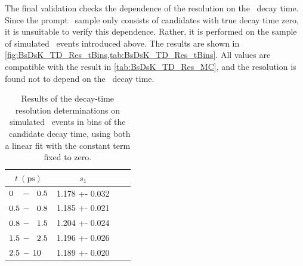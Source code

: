 The final validation checks the dependence of the resolution on the \Bs~decay time.
Since the prompt \Dspm~sample only consists of candidates with true decay time zero, it is unsuitable to verify this dependence.
Rather, it is performed on the sample of simulated \BsDsK~events introduced above.
The results are shown in \cref{fig:BsDsK_TD_Res_tBins,tab:BsDsK_TD_Res_tBins}.
All values are compatible with the result in \cref{tab:BsDsK_TD_Res_MC}, and the resolution is found not to depend on the \Bs~decay time.
%
\begin{table}[hb] \centerfloat
    \caption{
        Results of the decay-time resolution determinations on simulated \BsDsK~events in bins of the \Bs~candidate decay time, using both a linear fit with the constant term fixed to zero.}
    \label{tab:BsDsK_TD_Res_tBins}
    \begin{tabular}{cS[table-format=1.3(3)]S[table-format=2.1(1)]S[table-format=1.3(3)]}
        \toprule
        \(t~(\si{\ps})\)     & {\(s_{1}\)}    & \tabularnewline
        \midrule
        \(0\z\0\,-\,\00.5\)  & 1.178 +- 0.032 & \tabularnewline
        \(  0.5\,-\,\00.8\)  & 1.185 +- 0.021 & \tabularnewline
        \(  0.8\,-\,\01.5\)  & 1.204 +- 0.024 & \tabularnewline
        \(  1.5\,-\,\02.5\)  & 1.196 +- 0.026 & \tabularnewline
        \(  2.5\,-\,10\z\0\) & 1.189 +- 0.020 & \tabularnewline
        \bottomrule
    \end{tabular}
\end{table}
%
